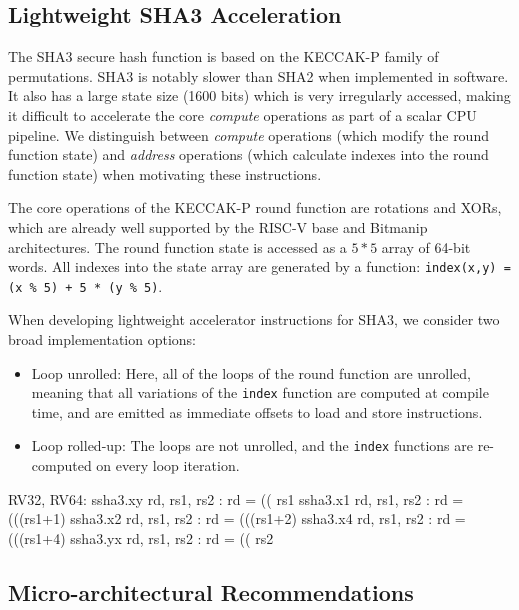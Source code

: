 

\subsection{Lightweight SHA3 Acceleration}

The SHA3 secure hash function \cite{nist:fips:202} is based on
the KECCAK-P family of permutations.
SHA3 is notably slower than SHA2 when implemented in software.
It also has a large state size (1600 bits) which is very irregularly
accessed, making it difficult to accelerate
the core {\em compute} operations as part of a scalar CPU pipeline.
We distinguish between {\em compute} operations (which modify the
round function state) and {\em address} operations (which calculate
indexes into the round function state) when motivating these instructions.

The core operations of the KECCAK-P round function are rotations
and XORs, which are already well supported by the RISC-V
base and Bitmanip architectures.
The round function state is accessed as a $5*5$ array of
64-bit words.
All indexes into the state array are generated by a function:
\lstinline{index(x,y) = (x % 5) + 5 * (y % 5)}.

When developing lightweight accelerator instructions for SHA3, we
consider two broad implementation options:
\begin{itemize}
\item Loop unrolled: Here, all of the loops of the round function are
    unrolled, meaning that all variations of the \lstinline{index}
    function are computed at compile time, and are emitted as immediate
    offsets to load and store instructions.
\item Loop rolled-up: The loops are not unrolled, and the
    \lstinline{index} functions are re-computed on every loop iteration.
\end{itemize}

\begin{isa}
RV32, RV64:
    ssha3.xy rd, rs1, rs2 : rd = (( rs1    %
    ssha3.x1 rd, rs1, rs2 : rd = (((rs1+1) %
    ssha3.x2 rd, rs1, rs2 : rd = (((rs1+2) %
    ssha3.x4 rd, rs1, rs2 : rd = (((rs1+4) %
    ssha3.yx rd, rs1, rs2 : rd = (( rs2    %
\end{isa}


\subsection{Micro-architectural Recommendations}




